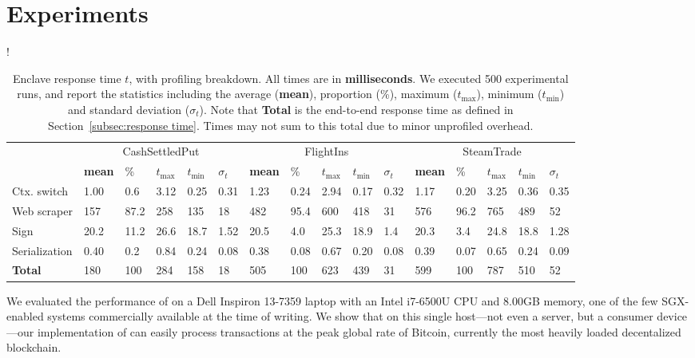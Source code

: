 \vspace{-1mm}
\section{Experiments}
\vspace{-1mm}
\label{sec:experiments}

\begin{table*}
\resizebox{\linewidth} {!}{
\begin{tabular}{l|lllll|lllll|lllll}
\toprule
& \multicolumn{5}{c|}{\sf CashSettledPut} &
  \multicolumn{5}{c|}{\sf FlightIns} &
  \multicolumn{5}{c}{\sf SteamTrade} \\
    & \textbf{mean} & \% & $t_{\max}$ & $t_{\min}$ & $\sigma_t$ & \textbf{mean}
    & \% & $t_{\max}$ & $t_{\min}$ & $\sigma_t$ & \textbf{mean} & \% & $t_{\max}$
    & $t_{\min}$ & $\sigma_t$\\
\midrule
    Ctx. switch & 1.00 & 0.6 & 3.12 & 0.25 & 0.31 
                & 1.23 & 0.24 & 2.94 & 0.17 & 0.32 
                & 1.17 & 0.20 & 3.25 & 0.36 & 0.35\\
    Web scraper & 157  & 87.2 & 258 & 135 & 18 
                & 482  & 95.4 & 600 & 418 & 31 
                & 576  & 96.2 & 765 & 489 & 52\\
    Sign        & 20.2 & 11.2 & 26.6 & 18.7 & 1.52 
                & 20.5 & 4.0 & 25.3 & 18.9 & 1.4 
                & 20.3 & 3.4 & 24.8 & 18.8 & 1.28\\
    Serialization 
                & 0.40 & 0.2 & 0.84 & 0.24 & 0.08 
                & 0.38 & 0.08 & 0.67 & 0.20 & 0.08 
                & 0.39 & 0.07 & 0.65 & 0.24 & 0.09\\
\midrule
\midrule
    \textbf{Total} 
                & 180 & 100 & 284 & 158 & 18 
                & 505 & 100 & 623 & 439 & 31 
                & 599 & 100 & 787 & 510 & 52 \\
\bottomrule	
\end{tabular}
}
\caption{Enclave response time $t$, with profiling breakdown. All times are in {\bf milliseconds}.
We executed 500 experimental runs, and report
the statistics including 
the average ({\bf mean}), proportion (\%), maximum ($t_{\max}$),
minimum ($t_{\min}$) and standard deviation ($\sigma_t$). Note that {\bf Total} is the end-to-end response time as 
defined in Section~\ref{subsec:response time}. Times may not
sum to this total due to minor unprofiled overhead.}
\label{tab:eval_profiling}
\end{table*}

We evaluated the performance of \tc on a Dell Inspiron 13-7359 laptop 
with an Intel i7-6500U CPU and 8.00GB memory, one of the few SGX-enabled systems commercially available at the
time of writing. We
show that on this single host---not even a server, but a consumer device---our implementation of \tc can easily process
transactions at the peak global rate of Bitcoin, currently the most heavily loaded decentalized blockchain. 

